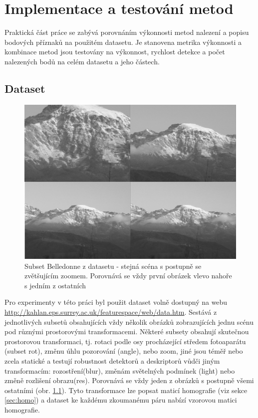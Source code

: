 
\chapter{Implementace a testování metod}
\label{chap:impl}

Praktická část práce se zabývá porovnáním výkonnosti metod nalezení a popisu bodových příznaků na použitém datasetu. Je stanovena metrika výkonnosti a kombinace metod jsou testovány na výkonnost, rychlost detekce a počet nalezených bodů na celém datasetu a jeho částech.

\section{Dataset}

\begin{figure}[!ht] 
	\centering
	\includegraphics[width=5in]{img/belledonne.png}
	\caption{Subset Belledonne z datasetu - stejná scéna s postupně se zvětšujícím zoomem. Porovnává se vždy první obrázek vlevo nahoře s jedním z ostatních } 	\label{dataset_belledonne}
\end{figure}

Pro experimenty v této práci byl použit dataset volně dostupný na webu \url{http://kahlan.eps.surrey.ac.uk/featurespace/web/data.htm}. Sestává z jednotlivých subsetů obsahujících vždy několik obrázků zobrazujících jednu scénu pod různými prostorovými transformacemi. Některé subsety obsahují skutečnou prostorovou transformaci, tj. rotaci podle osy procházející středem fotoaparátu (subset rot), změnu úhlu pozorování (angle), nebo zoom, jiné jsou téměř nebo zcela statické a testují robustnost detektorů a deskriptorů vůdči jiným transformacím: rozostření(blur), změnám světelných podmínek (light) nebo změně rozlišení obrazu(res). Porovnává se vždy jeden z obrázků s postupně všemi ostatními (obr. \ref{dataset_belledonne}). Tyto transformace lze popsat maticí homografie (viz sekce \ref{sec:homo}) a dataset ke každému zkoumanému páru nabízí vzorovou matici homografie.

